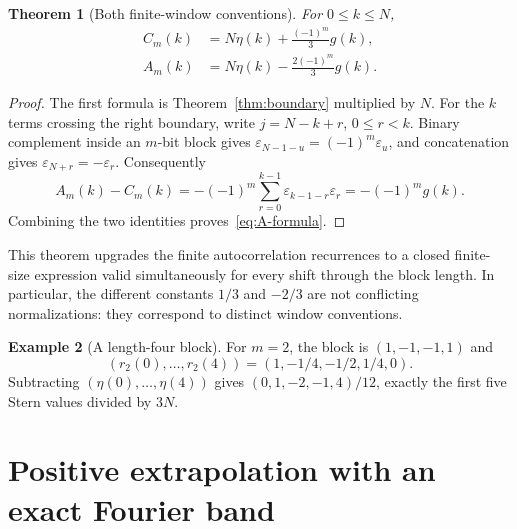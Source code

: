 \documentclass[11pt,a4paper]{article}
\numberwithin{equation}{section}
\newtheorem{theorem}{Theorem}[section]
\theoremstyle{definition}
\newtheorem{example}[theorem]{Example}
\theoremstyle{remark}
\newcommand{\eps}{\varepsilon}
\begin{document}
\begin{theorem}[Both finite-window conventions]
\label{thm:forward}
For $0\le k\le N$,
\begin{align}
 C_m(k)&=N\eta(k)+\frac{(-1)^m}{3}g(k),\label{eq:C-formula}\\
 A_m(k)&=N\eta(k)-\frac{2(-1)^m}{3}g(k).
 \label{eq:A-formula}
\end{align}
\end{theorem}
\begin{proof}
The first formula is Theorem~\ref{thm:boundary} multiplied by $N$.
For the $k$ terms crossing the right boundary, write $j=N-k+r$, $0\le r<k$.
Binary complement inside an $m$-bit block gives
$\eps_{N-1-u}=(-1)^m\eps_u$, and concatenation gives $\eps_{N+r}=-\eps_r$.
Consequently
\[
 A_m(k)-C_m(k)
 =-(-1)^m\sum_{r=0}^{k-1}\eps_{k-1-r}\eps_r
 =-(-1)^mg(k).
\]
Combining the two identities proves~\eqref{eq:A-formula}.
\end{proof}

This theorem upgrades the finite autocorrelation recurrences to a closed
finite-size expression valid simultaneously for every shift through the block
length. In particular, the different constants $1/3$ and $-2/3$ are not conflicting
normalizations: they correspond to distinct window conventions.

\begin{example}[A length-four block]
For $m=2$, the block is $(1,-1,-1,1)$ and
\[
 (r_2(0),\ldots,r_2(4))=(1,-1/4,-1/2,1/4,0).
\]
Subtracting $(\eta(0),\ldots,\eta(4))$ gives
$(0,1,-2,-1,4)/12$, exactly the first five Stern values divided by $3N$.
\end{example}

\section{Positive extrapolation with an exact Fourier band}
\label{sec:positive}
\end{document}
